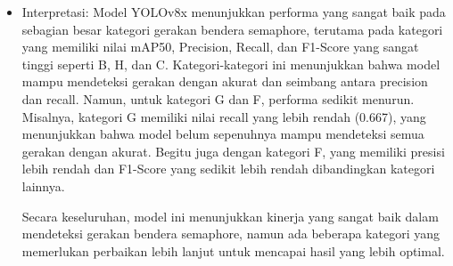 \documentclass[12pt,a4paper]{article}
\begin{document}
\begin{adjustwidth}{3em}{0pt}
\begin{itemize}
    \item Interpretasi: Model YOLOv8x menunjukkan performa yang sangat baik pada sebagian besar kategori gerakan bendera semaphore, terutama pada kategori yang memiliki nilai mAP50, Precision, Recall, dan F1-Score yang sangat tinggi seperti B, H, dan C. Kategori-kategori ini menunjukkan bahwa model mampu mendeteksi gerakan dengan akurat dan seimbang antara precision dan recall. Namun, untuk kategori G dan F, performa sedikit menurun. Misalnya, kategori G memiliki nilai recall yang lebih rendah (0.667), yang menunjukkan bahwa model belum sepenuhnya mampu mendeteksi semua gerakan dengan akurat. Begitu juga dengan kategori F, yang memiliki presisi lebih rendah dan F1-Score yang sedikit lebih rendah dibandingkan kategori lainnya.
      
Secara keseluruhan, model ini menunjukkan kinerja yang sangat baik dalam mendeteksi gerakan bendera semaphore, namun ada beberapa kategori yang memerlukan perbaikan lebih lanjut untuk mencapai hasil yang lebih optimal. 
\end{itemize}
\end{adjustwidth}
\end{document}
